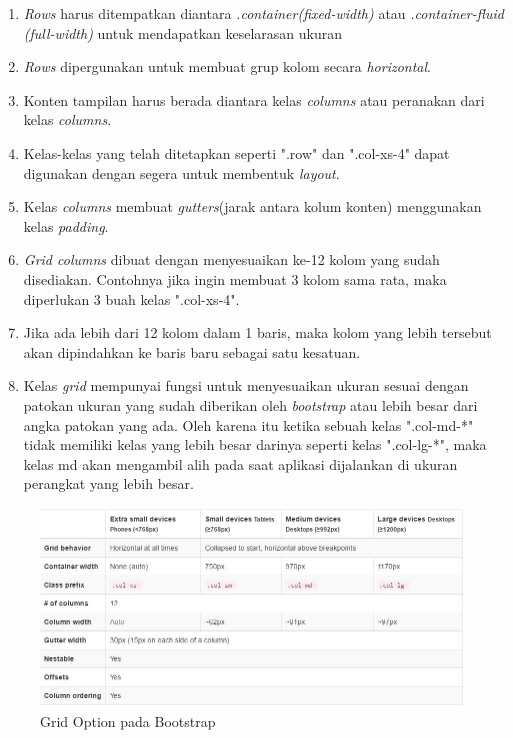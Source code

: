 	\begin{enumerate}
		\item \textit{Rows} harus ditempatkan diantara \textit{.container(fixed-width)} atau \textit{.container-fluid (full-width)} untuk mendapatkan keselarasan ukuran
		\item \textit{Rows} dipergunakan untuk membuat grup kolom secara \textit{horizontal}.
		\item Konten tampilan harus berada diantara kelas \textit{columns} atau peranakan dari kelas \textit{columns}.
		\item Kelas-kelas yang telah ditetapkan seperti ".row" dan ".col-xs-4" dapat digunakan dengan segera untuk membentuk \textit{layout}.
		\item Kelas \textit{columns} membuat \textit{gutters}(jarak antara kolum konten) menggunakan kelas \textit{padding}.
		\item \textit{Grid columns} dibuat dengan menyesuaikan ke-12 kolom yang sudah disediakan. Contohnya jika ingin membuat 3 kolom sama rata, maka diperlukan 3 buah kelas ".col-xs-4".
		\item Jika ada lebih dari 12 kolom dalam 1 baris, maka kolom yang lebih tersebut akan dipindahkan ke baris baru sebagai satu kesatuan.
		\item Kelas \textit{grid} mempunyai fungsi untuk menyesuaikan ukuran sesuai dengan patokan ukuran yang sudah diberikan oleh \textit{bootstrap} atau lebih besar dari angka patokan yang ada. Oleh karena itu ketika sebuah kelas ".col-md-*" tidak memiliki kelas yang lebih besar darinya seperti kelas ".col-lg-*", maka kelas md akan mengambil alih pada saat aplikasi dijalankan di ukuran perangkat yang lebih besar. 
	\end{enumerate}
		
	\begin{figure}[H]
		\centering
		\includegraphics[scale=0.75]{Gambar/gridOption}
		\caption{Grid Option pada Bootstrap}
		\label{fig:gridOpt}
	\end{figure}
	
